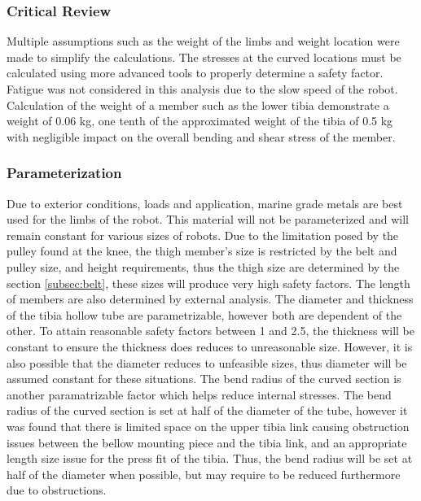 \subsubsection{Critical Review}
Multiple assumptions such as the weight of the limbs and weight location were made to simplify the calculations. The stresses at the curved locations must be calculated using more advanced tools to properly determine a safety factor. Fatigue was not considered in this analysis due to the slow speed of the robot. Calculation of the weight of a member such as the lower tibia demonstrate a weight of 0.06 kg, one tenth of the approximated weight of the tibia of 0.5 kg with negligible impact on the overall bending and shear stress of the member. 

\subsubsection{Parameterization}
Due to exterior conditions, loads and application, marine grade metals are best used for the limbs of the robot. This material will not be parameterized and will remain constant for various sizes of robots. Due to the limitation posed by the pulley found at the knee, the thigh member's size is restricted by the belt and pulley size, and height requirements, thus the thigh size are determined by the section \ref{subsec:belt}, these sizes will produce very high safety factors. The length of members are also determined by external analysis. The diameter and thickness of the tibia hollow tube are parametrizable, however both are dependent of the other. To attain reasonable safety factors between 1 and 2.5, the thickness will be constant to ensure the thickness does reduces to unreasonable size. However, it is also possible that the diameter reduces to unfeasible sizes, thus diameter will be assumed constant for these situations. The bend radius of the curved section is another paramatrizable factor which helps reduce internal stresses.   The bend radius of the curved section is set at half of the diameter of the tube, however it was found that there is limited space on the upper tibia link causing obstruction issues between the bellow mounting piece and the tibia link, and an appropriate length size issue for the press fit of the tibia. Thus, the bend radius will be set at half of the diameter when possible, but may require to be reduced furthermore due to obstructions. 
